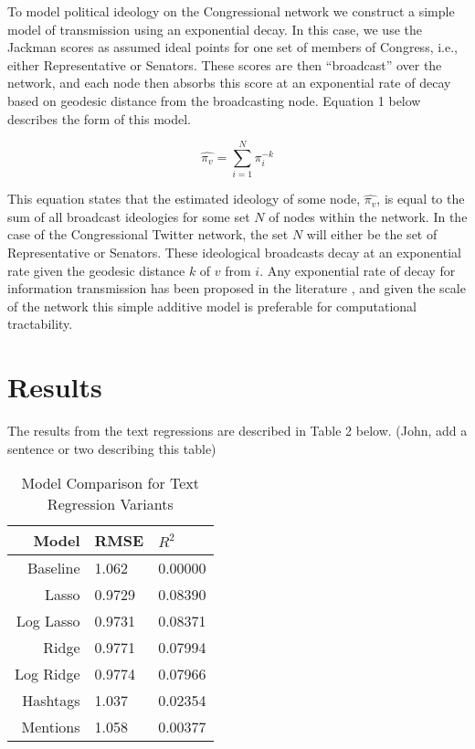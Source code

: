 \documentclass[10pt]{article}
\begin{document}
To model political ideology on the Congressional network we construct a simple model of transmission using an exponential decay.  In this case, we use the Jackman scores as assumed ideal points for one set of members of Congress, i.e., either Representative or Senators.  These scores are then ``broadcast'' over the network, and each node then absorbs this score at an exponential rate of decay based on geodesic distance from the broadcasting node.  Equation 1 below describes the form of this model.

\begin{equation}
    \hat{\pi_{v}} = \displaystyle\sum_{i=1}^{N} \pi_{i}^{-k}
\end{equation}

This equation states that the estimated ideology of some node, $\hat{\pi_{v}}$, is equal to the sum of all broadcast ideologies for some set $N$ of nodes within the network.  In the case of the Congressional Twitter network, the set $N$ will either be the set of Representative or Senators.  These ideological broadcasts decay at an exponential rate given the geodesic distance $k$ of $v$ from $i$.  Any exponential rate of decay for information transmission has been proposed in the literature \citep{Wu_2004}, and given the scale of the network this simple additive model is preferable for computational tractability.  

\section{Results}

The results from the text regressions are described in Table 2 below.  (John, add a sentence or two describing this table)

\begin{table}[htdp]
\caption{Model Comparison for Text Regression Variants}
\begin{center}
\begin{tabular}{|r|l|l|}
\hline
Model & RMSE & $R^2$\\
\hline
Baseline & 1.062 & 0.00000 \\
Lasso & 0.9729 & 0.08390 \\
Log Lasso & 0.9731 & 0.08371 \\
Ridge & 0.9771 & 0.07994 \\
Log Ridge & 0.9774 & 0.07966 \\
Hashtags & 1.037 & 0.02354 \\
Mentions & 1.058 & 0.00377 \\
\hline
\end{tabular}
\end{center}
\end{table}
\end{document}
